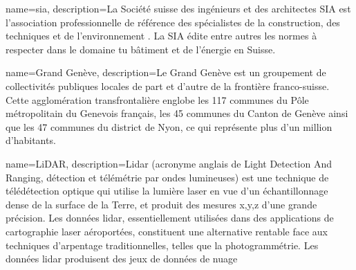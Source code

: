 {
    name=sia,
    description={La Société suisse des ingénieurs et des architectes SIA est l’association professionnelle de référence des spécialistes de la construction, des techniques et de l’environnement \cite{sia_sia_nodate}. La SIA édite entre autres les normes à respecter dans le domaine tu bâtiment et de l'énergie en Suisse.}
}

{
    name=Grand Genève,
    description={Le Grand Genève est un groupement de collectivités publiques locales de part et d’autre de la frontière franco-suisse. Cette agglomération transfrontalière englobe les 117 communes du Pôle métropolitain du Genevois français, les 45 communes du Canton de Genève ainsi que les 47 communes du district de Nyon, ce qui représente plus d’un million d’habitants. \cite{noauthor_grand_nodate}}
}

{
    name=LiDAR,
    description={Lidar (acronyme anglais de Light Detection And Ranging, détection et télémétrie par ondes lumineuses) est une technique de télédétection optique qui utilise la lumière laser en vue d'un échantillonnage dense de la surface de la Terre, et produit des mesures x,y,z d'une grande précision. Les données lidar, essentiellement utilisées dans des applications de cartographie laser aéroportées, constituent une alternative rentable face aux techniques d’arpentage traditionnelles, telles que la photogrammétrie. Les données lidar produisent des jeux de données de nuage \cite{esri_quoi_2025}}
}







